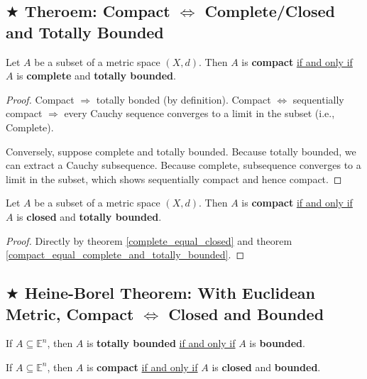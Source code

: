 \documentclass[11pt]{elegantbook}
\begin{document}
\subsection{$\bigstar$ Theroem: Compact $\Leftrightarrow$ Complete/Closed and Totally Bounded}
\begin{theorem}\label{compact_equal_complete_and_totally_bounded}
    Let $A$ be a subset of a metric space $(X, d)$. Then $A$ is \textbf{compact} \underline{if and only if} $A$ is \textbf{complete} and \textbf{totally bounded}.
\end{theorem}
\begin{proof}
    Compact $\Rightarrow$ totally bonded (by definition). Compact $\Leftrightarrow$ sequentially compact $\Rightarrow$ every Cauchy sequence converges to a limit in the subset (i.e., Complete).

    Conversely, suppose complete and totally bounded. Because totally bounded, we can extract a Cauchy subsequence. Because complete, subsequence converges to a limit in the subset, which shows sequentially compact and hence compact.
\end{proof}
\begin{corollary}
    Let $A$ be a subset of a metric space $(X, d)$. Then $A$ is \textbf{compact} \underline{if and only if} $A$ is \textbf{closed} and \textbf{totally bounded}.
\end{corollary}
\begin{proof}
    Directly by theorem \ref{complete_equal_closed} and theorem \ref{compact_equal_complete_and_totally_bounded}.
\end{proof}

\subsection{$\bigstar$ Heine-Borel Theorem: With Euclidean Metric, Compact $\Leftrightarrow$ Closed and Bounded}
\begin{claim}
    If $A \subseteq \mathbb{E}^n$, then $A$ is \textbf{totally bounded} \underline{if and only if} $A$ is \textbf{bounded}.
\end{claim}

\begin{theorem}
    If $A \subseteq \mathbb{E}^n$, then $A$ is \textbf{compact} \underline{if and only if} $A$ is \textbf{closed} and \textbf{bounded}.
\end{theorem}
\end{document}
